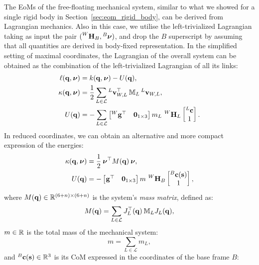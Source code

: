 The \acp{EoM} of the free-floating mechanical system, similar to what we showed for a single rigid body in Section~\ref{sec:eom_rigid_body}, can be derived from Lagrangian mechanics.
Also in this case, we utilise the left-trivialized Lagrangian taking as input the pair $(\homo[W]_B, \Nu[B])$, and drop the $B$ superscript by assuming that all quantities are derived in body-fixed representation.
In the simplified setting of maximal coordinates, the Lagrangian of the overall system can be obtained as the combination of the left-trivialized Lagrangian of all its links:
%
\begin{align*}
    \ell(\Qu, \Nu) &= k(\Qu, \Nu) - U(\Qu), \\
    \kappa(\Qu, \Nu) &= \frac{1}{2} \sum_{L \in \mathcal{L}} \velsix[L]_{W,L}^\top \masssix_L \velsix[L]_{W,L}, \\
    U(\Qu) &= - \sum_{L \in \mathcal{L}} \begin{bmatrix}\gravity[W]^\top & \zeros_{1\times3}\end{bmatrix}
    m_L \, \homo[W]_L
    \begin{bmatrix} {}^L\mathbf{c} \\ 1 \end{bmatrix}
    .
\end{align*}
%
In reduced coordinates, we can obtain an alternative and more compact expression of the energies:
%
\begin{align*}
    \kappa(\Qu, \Nu) &= \frac{1}{2} \Nu^\top M(\Qu) \Nu, \\
    U(\Qu) &= -\begin{bmatrix}\gravity^\top & \zeros_{1\times3}\end{bmatrix}
    m \, \homo[W]_B
    \begin{bmatrix}{}^B\mathbf{c}(\Shape) \\ 1 \end{bmatrix}
    ,
\end{align*}
%
where $M(\Qu) \in \realn^{(6+n)\times(6+n)}$ is the system's \emph{mass matrix}, defined as:
%
\begin{equation}
    \label{eq:mass_matrix}
    M(\Qu) = \sum_{L\in\mathcal{L}} J_L^\top(\Qu) \masssix_L J_L(\Qu),
\end{equation}
%
$m \in \realn$ is the total mass of the mechanical system:
%
\begin{equation*}
    m = \sum_{L\in\mathcal{L}} m_L
    ,
\end{equation*}
%
and ${}^B\mathbf{c}(\Shape) \in \realn^3$ is its \ac{CoM} expressed in the coordinates of the base frame $B$:
